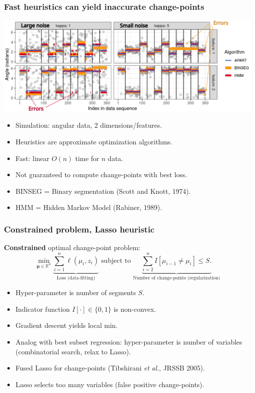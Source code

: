 \documentclass{beamer}
\newcommand{\RR}{\mathbb R}
\begin{document}
\begin{frame}
  \frametitle{Fast heuristics can yield inaccurate change-points}
  \includegraphics[width=\textwidth]{figure-2d-hmm-sim-noise-many-errors}
  \begin{itemize}
  \item Simulation: angular data, 2 dimensions/features.
  \item Heuristics are approximate optimization algorithms.
  \item Fast: linear $O(n)$ time for $n$ data.
  \item Not guaranteed to compute change-points with best loss.
  \item BINSEG = Binary segmentation (Scott and Knott, 1974).
  \item HMM = Hidden Markov Model (Rabiner, 1989).
  \end{itemize}
\end{frame}

\begin{frame}
  \frametitle{Constrained problem, Lasso heuristic}
  \textbf{Constrained} optimal change-point problem:
$$
\min_{
  \mathbf \mu\in\RR^{n}
}
\underbrace{
  \sum_{i=1}^{n} \ell( \mu_i,  z_i)
}_{
  \text{Loss (data-fitting)}
}
\text{ subject to }
\underbrace{
  \sum_{i=2}^n I[\mu_{i-1}\neq \mu_i] \leq S.
}_{
  \text{Number of change-points (regularization)}
}
$$
\begin{itemize}
\item Hyper-parameter is number of segments $S$.
\item Indicator function $I[\cdot ]\in\{0,1\}$ is non-convex.
\item Gradient descent yields local min.
\item Analog with best subset regression: hyper-parameter is number of variables (combinatorial search, relax to Lasso).
\item Fused Lasso for change-points (Tibshirani \emph{et al.}, JRSSB 2005).
\item Lasso selects too many variables (false positive change-points).
\end{itemize}
\end{frame}
\end{document}
